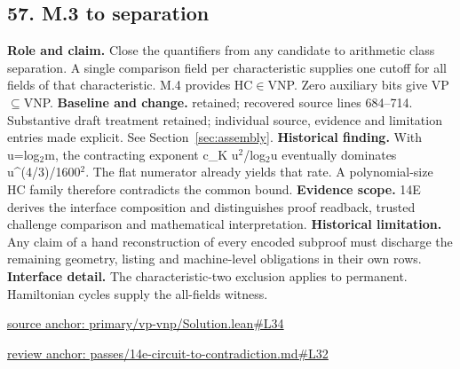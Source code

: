 \documentclass[11pt,letterpaper]{article}
\theoremstyle{definition}\newtheorem{definition}[theorem]{Definition}\newtheorem{example}[theorem]{Example}
\theoremstyle{remark}\newtheorem{remark}[theorem]{Remark}
\begin{document}
\subsection*{57. M.3 to separation}
\textbf{Role and claim.} Close the quantifiers from any candidate to arithmetic class separation. A single comparison field per characteristic supplies one cutoff for all fields of that characteristic. M.4 provides HC\ensuremath{\in}VNP. Zero auxiliary bits give VP\ensuremath{\subseteq}VNP.
\textbf{Baseline and change.} retained; recovered source lines 684--714. Substantive draft treatment retained; individual source, evidence and limitation entries made explicit. See Section~\ref{sec:assembly}.
\textbf{Historical finding.} With u=log\ensuremath{{}_2}m, the contracting exponent c\_K u\ensuremath{{}^2}/log\ensuremath{{}_2}u eventually dominates u\textasciicircum{}(4/3)/1600\ensuremath{{}^2}. The flat numerator already yields that rate. A polynomial-size HC family therefore contradicts the common bound.
\textbf{Evidence scope.} 14E derives the interface composition and distinguishes proof readback, trusted challenge comparison and mathematical interpretation.
\textbf{Historical limitation.} Any claim of a hand reconstruction of every encoded subproof must discharge the remaining geometry, listing and machine-level obligations in their own rows.
\textbf{Interface detail.} The characteristic-two exclusion applies to permanent. Hamiltonian cycles supply the all-fields witness.
\par\href{https://github.com/nousentllc/VP-VNP-Review/blob/8a7976933b6b2b4ffda1ad3a0dfb5fc6b6f023e8/primary/vp-vnp/Solution.lean\#L34}{source anchor: primary/vp-vnp/Solution.lean\#L34}
\par\href{https://github.com/nousentllc/VP-VNP-Review/blob/8a7976933b6b2b4ffda1ad3a0dfb5fc6b6f023e8/passes/14e-circuit-to-contradiction.md\#L32}{review anchor: passes/14e-circuit-to-contradiction.md\#L32}
\goodbreak
\end{document}
